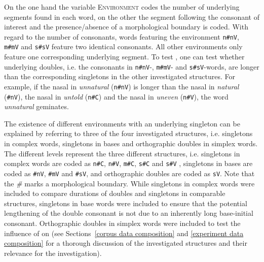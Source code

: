   
  On the one hand the variable \textsc{Environment} codes the number of underlying segments found in each word, on the other the segment following the consonant of interest and the presence/absence of a morphological boundary is coded.  With regard to the number of consonants,  words featuring the environment \texttt{n\#nV}, \texttt{ m\#mV} and \texttt{s\#sV} feature two identical consonants. All other environments only feature one corresponding underlying segment. 
  To test , one can test whether underlying doubles, i.e. the consonants in \texttt{n\#nV}-,  \texttt{m\#mV}- and \texttt{s\#sV}-words, are longer than the corresponding singletons in the other investigated structures. For example, if the nasal in \textit{unnatural} (\texttt{n\#nV}) is longer than the nasal in \textit{natural} (\texttt{\#nV}), the nasal in \textit{untold} (\texttt{n\#C}) and the nasal in \textit{uneven} (\texttt{n\#V}), the word \textit{unnatural} {geminates}.
  
  The existence of different environments with an underlying singleton can be explained by referring to three of the four investigated structures, i.e. singletons in complex words, singletons in bases and orthographic doubles in simplex words. The different levels represent the three different structures, i.e. singletons in complex words are coded as \texttt{n\#C}, \texttt{n\#V}, \texttt{m\#C}, \texttt{s\#C} and \texttt{s\#V} , singletons in bases are coded as \texttt{\#nV}, \texttt{\#mV} and \texttt{\#sV}, and orthographic doubles are coded as \texttt{sV}. Note that the \textit{\#} marks a morphological boundary.
  While singletons in complex words were included to compare durations of doubles and singletons in comparable structures, singletons in base words were included to ensure that the potential lengthening of the double consonant is not due to an inherently long base-initial consonant. Orthographic doubles in simplex words were included to test the influence of  on  (see Sections~\ref{corpus data composition} and \ref{experiment data composition} for a thorough discussion of the investigated structures and their relevance for the investigation).
  
  

